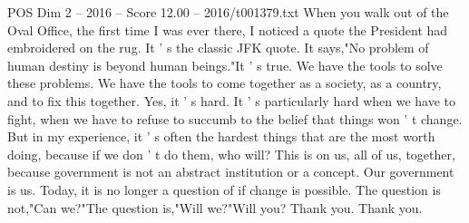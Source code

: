 \begin{textsample}{POS Dim 2 – 2016 – Score 12.00 – 2016/t001379.txt}
When you walk out of the Oval Office, the first time I was ever there, I noticed a quote the President had embroidered on the rug.
It ' s the classic JFK quote.
It says,"No problem of human destiny is beyond human beings."It ' s true.
We have the tools to solve these problems.
We have the tools to come together as a society, as a country, and to fix this together.
Yes, it ' s hard.
It ' s particularly hard when we have to fight, when we have to refuse to succumb to the belief that things won ' t change.
But in my experience, it ' s often the hardest things that are the most worth doing, because if we don ' t do them, who will?
This is on us, all of us, together, because government is not an abstract institution or a concept.
Our government is us.
Today, it is no longer a question of if change is possible.
The question is not,"Can we?"The question is,"Will we?"Will you?
Thank you.
Thank you.

\end{textsample}
